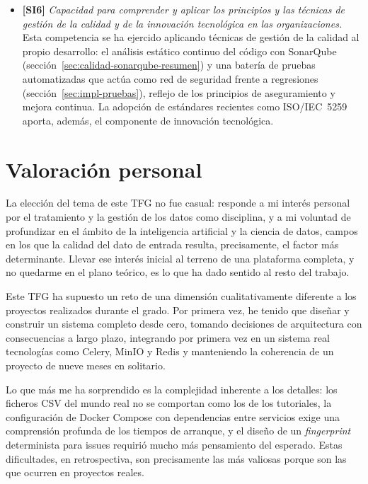 \begin{itemize}
  \item \textbf{[SI6]} \emph{Capacidad para comprender y aplicar los principios
    y las técnicas de gestión de la calidad y de la innovación tecnológica en
    las organizaciones.}\\
    Esta competencia se ha ejercido aplicando técnicas de gestión de la calidad
    al propio desarrollo: el análisis estático continuo del código con SonarQube
    (sección~\ref{sec:calidad-sonarqube-resumen}) y una batería de pruebas
    automatizadas que actúa como red de seguridad frente a regresiones
    (sección~\ref{sec:impl-pruebas}), reflejo de los principios de aseguramiento
    y mejora continua.  La adopción de estándares recientes como
    \ac{ISO}/\ac{IEC}~5259 aporta, además, el componente de innovación
    tecnológica.
\end{itemize}


\section{Valoración personal}
\label{sec:valoracion-personal}

La elección del tema de este \ac{TFG} no fue casual: responde a mi interés
personal por el tratamiento y la gestión de los datos como disciplina, y a
mi voluntad de profundizar en el ámbito de la inteligencia artificial y la
ciencia de datos, campos en los que la calidad del dato de entrada resulta,
precisamente, el factor más determinante.  Llevar ese interés inicial al
terreno de una plataforma completa, y no quedarme en el plano teórico, es
lo que ha dado sentido al resto del trabajo.

Este \ac{TFG} ha supuesto un reto de una dimensión cualitativamente
diferente a los proyectos realizados durante el grado.  Por primera vez, he
tenido que diseñar y construir un sistema completo desde cero, tomando
decisiones de arquitectura con consecuencias a largo plazo, integrando por
primera vez en un sistema real tecnologías como Celery, MinIO y Redis
y manteniendo la coherencia de un proyecto de nueve meses en solitario.

Lo que más me ha sorprendido es la complejidad inherente a los detalles:
los ficheros \ac{CSV} del mundo real no se comportan como los de los tutoriales,
la configuración de Docker Compose con dependencias entre servicios exige
una comprensión profunda de los tiempos de arranque, y el diseño de un
\emph{fingerprint} determinista para issues requirió mucho más pensamiento
del esperado.  Estas dificultades, en retrospectiva, son precisamente las
más valiosas porque son las que ocurren en proyectos reales.

